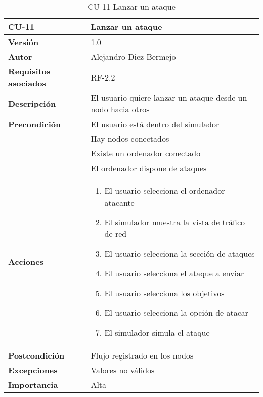 \begin{table}[p]
	\centering
	\begin{tabularx}{\linewidth}{ p{} p{} }
		\toprule
		\textbf{CU-11}    & \textbf{Lanzar un ataque}\\
		\toprule
		\textbf{Versión}              & 1.0    \\
		\textbf{Autor}                & Alejandro Diez Bermejo \\
		\textbf{Requisitos asociados} & RF-2.2 \\
		\textbf{Descripción}          & El usuario quiere lanzar un ataque desde un nodo hacia otros \\
        \textbf{Precondición}         & El usuario está dentro del simulador \\
                                      & Hay nodos conectados \\
                                      & Existe un ordenador conectado \\
                                      & El ordenador dispone de ataques \\
		\textbf{Acciones}             &
		\begin{enumerate}
			\def\labelenumi{\arabic{enumi}.}
			\tightlist
			\item El usuario selecciona el ordenador atacante
            \item El simulador muestra la vista de tráfico de red
            \item El usuario selecciona la sección de ataques
            \item El usuario selecciona el ataque a enviar
            \item El usuario selecciona los objetivos
            \item El usuario selecciona la opción de atacar
            \item El simulador simula el ataque
		\end{enumerate}\\
		\textbf{Postcondición}        & Flujo registrado en los nodos \\
		\textbf{Excepciones}          & Valores no válidos \\
		\textbf{Importancia}          & Alta \\
		\bottomrule
	\end{tabularx}
	\caption{CU-11 Lanzar un ataque}
\end{table}

